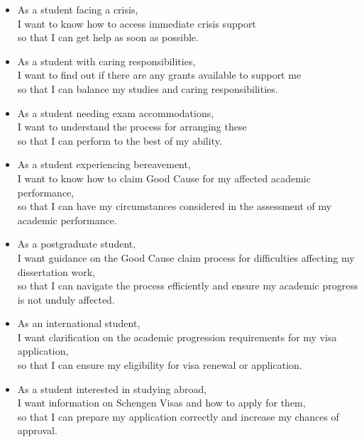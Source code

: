 \documentclass{l4proj}
\begin{document}
\begin{appendices}
\begin{itemize}
    \vspace{1em}
    \item As a student facing a crisis, \\I want to know how to access immediate crisis support \\so that I can get help as soon as possible.
    \vspace{1em}
    \item As a student with caring responsibilities, \\I want to find out if there are any grants available to support me \\so that I can balance my studies and caring responsibilities.
    \vspace{1em}
    \item As a student needing exam accommodations, \\I want to understand the process for arranging these \\so that I can perform to the best of my ability.
    \vspace{1em}
    \item As a student experiencing bereavement, \\I want to know how to claim Good Cause for my affected academic performance, \\so that I can have my circumstances considered in the assessment of my academic performance.
    \vspace{1em}
    \item As a postgraduate student, \\I want guidance on the Good Cause claim process for difficulties affecting my dissertation work, \\so that I can navigate the process efficiently and ensure my academic progress is not unduly affected.
    \vspace{1em}
    \item As an international student, \\I want clarification on the academic progression requirements for my visa application, \\so that I can ensure my eligibility for visa renewal or application.
    \vspace{1em}
    \item As a student interested in studying abroad, \\I want information on Schengen Visas and how to apply for them, \\so that I can prepare my application correctly and increase my chances of approval.
    \vspace{1em}

\end{itemize}
\end{appendices}
\end{document}
